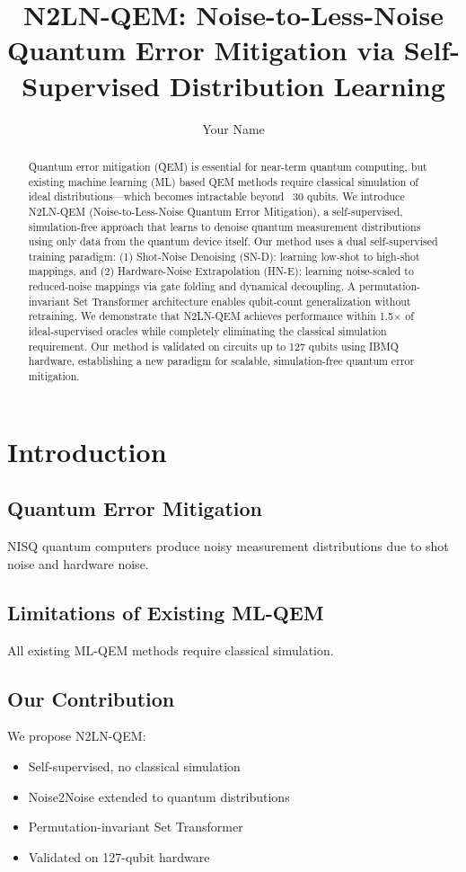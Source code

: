 ﻿\documentclass[twocolumn]{revtex4-2}
\title{N2LN-QEM: Noise-to-Less-Noise Quantum Error Mitigation via Self-Supervised Distribution Learning}
\author{Your Name}
\affiliation{Your Institution}
\begin{document}
\maketitle

\begin{abstract}
Quantum error mitigation (QEM) is essential for near-term quantum computing,
but existing machine learning (ML) based QEM methods require classical
simulation of ideal distributions---which becomes intractable beyond ~30 qubits.
We introduce N2LN-QEM (Noise-to-Less-Noise Quantum Error Mitigation),
a self-supervised, simulation-free approach that learns to denoise quantum
measurement distributions using only data from the quantum device itself.
Our method uses a dual self-supervised training paradigm:
(1) Shot-Noise Denoising (SN-D): learning low-shot to high-shot mappings,
and (2) Hardware-Noise Extrapolation (HN-E): learning noise-scaled to
reduced-noise mappings via gate folding and dynamical decoupling.
A permutation-invariant Set Transformer architecture enables qubit-count
generalization without retraining. We demonstrate that N2LN-QEM achieves
performance within 1.5$\times$ of ideal-supervised oracles while completely
eliminating the classical simulation requirement. Our method is validated
on circuits up to 127 qubits using IBMQ hardware, establishing a new paradigm
for scalable, simulation-free quantum error mitigation.
\end{abstract}

\section{Introduction}

\subsection{Quantum Error Mitigation}
NISQ quantum computers produce noisy measurement distributions due to
shot noise and hardware noise. \cite{cai2023qemreview}

\subsection{Limitations of Existing ML-QEM}
All existing ML-QEM methods require classical simulation. \cite{liao2024mlqem,liao2025daem,wang2026gem,czarnik2021cdr}

\subsection{Our Contribution}
We propose N2LN-QEM:
\begin{itemize}
\item Self-supervised, no classical simulation
\item Noise2Noise extended to quantum distributions \cite{lehtinen2018noise2noise}
\item Permutation-invariant Set Transformer \cite{lee2019settransformer}
\item Validated on 127-qubit hardware
\end{itemize}
\end{document}
